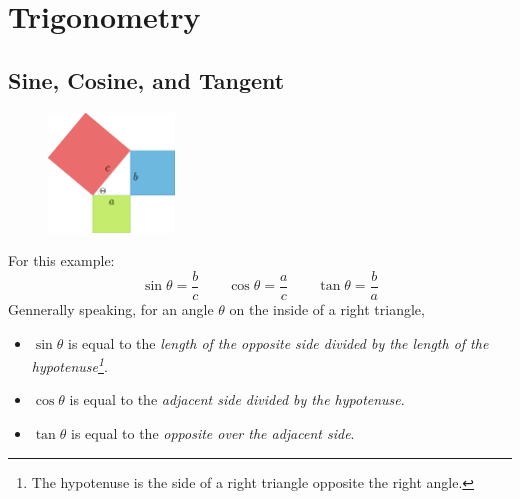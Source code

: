 \chapter{Trigonometry}

\section{Sine, Cosine, and Tangent}
\begin{figure}[H]
  \begin{center}
    \includegraphics[width=0.3\textwidth]{continuous/trig/basictrig.eps}
  \end{center}
\end{figure}

For this example:
  \[\displaystyle{\sin\theta=\frac{b}{c}}\qquad
  \displaystyle{\cos\theta=\frac{a}{c}}\qquad
  \displaystyle{\tan\theta=\frac{b}{a}}\]
Gennerally speaking, for an angle $\theta$ on the inside of a right triangle,
\begin{itemize}
  \item$\sin\theta$ is equal to the \emph{length of the opposite side divided by the length of the hypotenuse\footnote{The hypotenuse is the side of a right triangle opposite the right angle.}}.
  \item$\cos\theta$ is equal to the \emph{adjacent side divided by the hypotenuse}.
  \item$\tan\theta$ is equal to the \emph{opposite over the adjacent side}.
\end{itemize}



